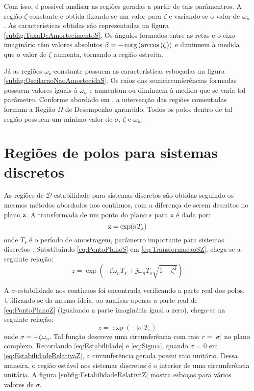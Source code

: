 Com isso, é possível analisar as regiões geradas a partir de tais parâmentros. A região $\zeta$-constante é obtida fixando-se um valor para $\zeta$ e variando-se o valor de $\omega_n$. As características obtidas são representadas na figura \ref{subfig:TaxaDeAmortecimentoS}. Os ângulos formados entre as retas e o eixo imaginário têm valores absolutos $\beta = -\operatorname{cotg}{\left(\arccos{\left(\zeta\right)}\right)}$ e diminuem à medida que o valor de $\zeta$ aumenta, tornando a região estreita.

Já as regiões $\omega_n$-constante possuem as características esboçadas na figura \ref{subfig:OscilacaoNaoAmortecidaS}. Os raios das semicircunferências formadas possuem valores iguais à $\omega_n$ e aumentam ou diminuem à medida que se varia tal parâmetro. Conforme abordado em \cite{CHILALI1996}, a intersecção das regiões comentadas formam a Região $\Omega$ de Desempenho garantido. Todos os polos dentro de tal região possuem um mínimo valor de $\sigma$, $\zeta$ e $\omega_n$.

\section{Regiões de polos para sistemas discretos}\label{sec:DEstabilidadeZ}

As regiões de $\mathscr{D}$-estabilidade para sistemas discretos são obtidas seguindo os mesmos métodos abordados nos contínuos, com a diferença de serem descritos no plano $\operatorname{\mathrm{z}}$. A transformada de um ponto do plano $\operatorname{\mathrm{s}}$ para $\operatorname{\mathrm{z}}$ é dada por:
\begin{equation}
  \operatorname{\mathrm{z}} = \exp(\operatorname{\mathrm{s}} T_s)\label{eq:TransformacaoSZ}
\end{equation}
onde $T_s$ é o período de amostragem, parâmetro importante para sistemas discretos \cite{KUO1980}. Substituindo \eqref{eq:PontoPlanoS} em \eqref{eq:TransformacaoSZ}, chega-se a seguinte relação:
\begin{equation}
  z = \exp{\left(-\zeta\omega_nT_s \pm j\omega_nT_s\sqrt{1-\zeta^2}\right)}\label{eq:PontoPlanoZ}
\end{equation}

A $\sigma$-estabilidade nos contínuos foi encontrada verificando a parte real dos polos. Utilizando-se da mesma ideia, ao analisar apenas a parte real de \eqref{eq:PontoPlanoZ} (igualando a parte imaginária igual a zero), chega-se na seguinte relação:
\begin{equation}
  z = \exp{\left(-|\sigma|T_s\right)}\label{eq:EstabilidadeRelativaZ}
\end{equation}
onde $\sigma = -\zeta\omega_n$. Tal função descreve uma circunferência com raio $r = |\sigma|$ no plano complexo. Recordando \eqref{eq:Estabilidade} e \eqref{eq:Sigma}, quando $\sigma = 0$ em \eqref{eq:EstabilidadeRelativaZ}, a circunferência gerada possui raio unitário. Dessa maneira, o região estável nos sistemas discretos é o interior de uma circunferência unitária. A figura \ref{subfig:EstabilidadeRelativaZ} mostra esboços para vários valores de $\sigma$.

